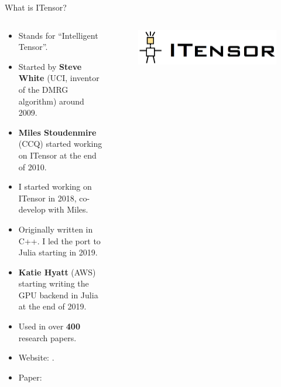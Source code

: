 \begin{frame}{What is ITensor?}

\begin{columns}

  \begin{column}[T]{0.7\textwidth}%

    \begin{itemize}[<+->]

      \item Stands for ``Intelligent Tensor''.
      \item Started by \textbf{Steve White} (UCI, inventor of the DMRG algorithm) around 2009.
      \item \textbf{Miles Stoudenmire} (CCQ) started working on ITensor at the end of 2010.
      \item I started working on ITensor in 2018, co-develop with Miles.
      \item Originally written in C++. I led the port to Julia starting in 2019.
      \item \textbf{Katie Hyatt} (AWS) starting writing the GPU backend in Julia at the end of 2019.
      \item Used in over \textbf{400} research papers.
      \item Website: .
      \item Paper: 

    \end{itemize}

  \end{column}

  \begin{column}[T]{0.3\textwidth}%

    \begin{figure}[T]
      \includegraphics[width=1.0\textwidth]{
        slides/assets/what-is-itensor-itensor.jpg
      }
    \end{figure}

    \begin{columns}

      \begin{column}[T]{0.5\textwidth}%


\end{column}
\end{columns}
\end{column}
\end{columns}
\end{frame}
